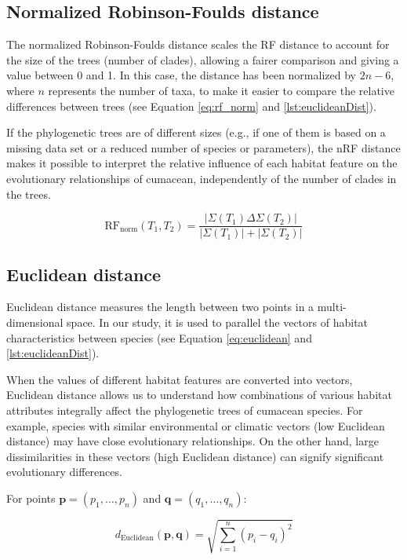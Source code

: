 \subsection{Normalized Robinson-Foulds distance}\label{RFnorm}

The normalized Robinson-Foulds distance scales the RF distance to account for the size  of the trees (number of clades), allowing a fairer comparison and giving a value between 0 and 1. In this case, the distance has been normalized by $2n-6$, where $n$ represents the number of taxa, to make it easier to compare the relative differences between trees (see Equation \eqref{eq:rf_norm} and \autoref{lst:euclideanDist}).

If the phylogenetic trees are of different sizes (e.g., if one of them is based on a missing data set or a reduced number of species or parameters), the nRF distance makes it possible to interpret the relative influence of each habitat feature on the evolutionary relationships of cumacean, independently of the number of clades in the trees.

\begin{equation}\label{eq:rf_norm}
    \text{RF}_{\text{norm}}(T_1, T_2) = \frac{| \Sigma(T_1) \Delta \Sigma(T_2) |}{| \Sigma(T_1) | + | \Sigma(T_2) |}
\end{equation}

\subsection{Euclidean distance}\label{euclidean}

Euclidean distance measures the length between two points in a multi-dimensional space. In our study, it is used to parallel the vectors of habitat characteristics between species (see Equation \eqref{eq:euclidean} and \autoref{lst:euclideanDist}).

When the values of different habitat features are converted into vectors, Euclidean distance allows us to understand how combinations of various habitat attributes integrally affect the phylogenetic trees of cumacean species. For example, species with similar environmental or climatic vectors (low Euclidean distance) may have close evolutionary relationships. On the other hand, large dissimilarities in these vectors (high Euclidean distance) can signify significant evolutionary differences.

For points $\mathbf{p} = (p_1, \ldots, p_n)$ and $\mathbf{q} = (q_1, \ldots, q_n)$:

\begin{equation}\label{eq:euclidean}
    d_{\text{Euclidean}}(\mathbf{p}, \mathbf{q}) = \sqrt{\sum_{i=1}^{n} (p_i - q_i)^2}
\end{equation}

